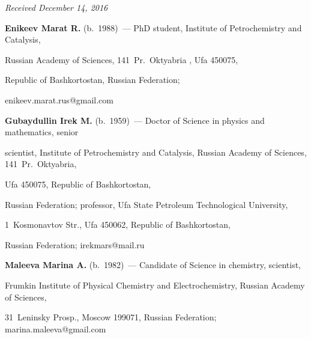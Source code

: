 \hfill{\small\textit{Received December 14, 2016}}





\Contr





\noindent


\textbf{Enikeev Marat R.} (b.\ 1988)~--- PhD student, Institute of Petrochemistry and Catalysis, 


Russian Academy of Sciences, 141~Pr.\ Oktyabria , Ufa 450075, 


Republic of Bashkortostan, Russian Federation; 


\mbox{enikeev.marat.rus@gmail.com}





\vspace*{3pt}





\noindent


\textbf{Gubaydullin Irek M.} (b.\ 1959)~--- Doctor of Science in physics and mathematics, senior 


scientist, Institute of Petrochemistry and Catalysis, Russian Academy of Sciences, 141~Pr.\ Oktyabria, 


Ufa 450075, Republic of Bashkortostan, 


Russian Federation; professor, Ufa State Petroleum Technological University, 


1~Kosmonavtov Str., Ufa 450062, Republic of Bashkortostan, 


Russian Federation; \mbox{irekmars@mail.ru}





\vspace*{3pt}





\noindent


\textbf{Maleeva Marina A.} (b.\ 1982)~--- Candidate of Science in chemistry, scientist, 


Frumkin Institute of Physical Chemistry and Electrochemistry, Russian Academy of Sciences, 


31~Leninsky Prosp., Moscow 199071, Russian Federation; \mbox{marina.maleeva@gmail.com}





\label{end\stat}








\renewcommand{\bibname}{\protect\rm Литература}


